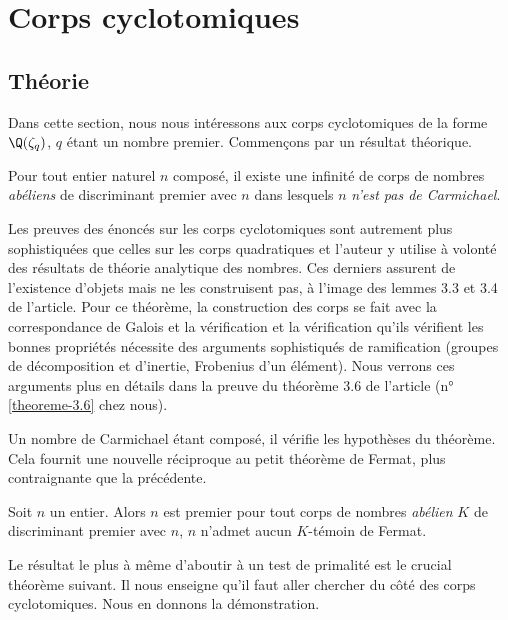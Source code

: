 \section{Corps cyclotomiques}

\subsection{Théorie}

Dans cette section, nous nous intéressons aux corps cyclotomiques de la forme $\Q(\zeta_q)$, $q$ étant un nombre premier. Commençons par un résultat théorique.

\begin{theoreme}
	Pour tout entier naturel $n$ composé, il existe une infinité de corps de nombres \emph{abéliens} de discriminant premier avec $n$ dans lesquels $n$ \emph{n'est pas de Carmichael}.
\end{theoreme}

\begin{MotSurPreuve}
	Les preuves des énoncés sur les corps cyclotomiques sont autrement plus sophistiquées que celles sur les corps quadratiques et l'auteur y utilise à volonté des résultats de théorie analytique des nombres. Ces derniers assurent de l'existence d'objets mais ne les construisent pas, à l'image des lemmes 3.3 et 3.4 de l'article. Pour ce théorème, la construction des corps se fait avec la correspondance de Galois et la vérification et la vérification qu'ils vérifient les bonnes propriétés nécessite des arguments sophistiqués de ramification (groupes de décomposition et d'inertie, Frobenius d'un élément). Nous verrons ces arguments plus en détails dans la preuve du théorème 3.6 de l'article (n°\ref{theoreme-3.6} chez nous). \\
\end{MotSurPreuve}

Un nombre de Carmichael étant composé, il vérifie les hypothèses du théorème. Cela fournit une nouvelle réciproque au petit théorème de Fermat, plus contraignante que la précédente.

\begin{theoreme}
	Soit $n$ un entier. Alors $n$ est premier \ssi pour tout corps de nombres \emph{abélien} $K$ de discriminant premier avec $n$, $n$ n'admet aucun $K$-témoin de Fermat.
\end{theoreme}

Le résultat le plus à même d'aboutir à un test de primalité est le crucial théorème suivant. Il nous enseigne qu'il faut aller chercher du côté des corps cyclotomiques. Nous en donnons la démonstration.

